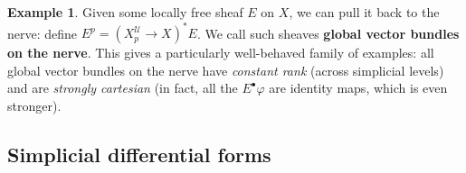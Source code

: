 \documentclass[11pt,fleqn]{article}
\theoremstyle{plain}
\theoremstyle{definition}
\newtheorem{example}[theorem]{Example}
\theoremstyle{remark}
\numberwithin{equation}{theorem}
\newcommand{\cover}{\mathcal{U}}
\newcommand{\define}[1]{\textbf{#1}}
\newcommand{\nerve}[1]{X_{#1}^\cover}
\begin{document}
        \begin{example}\label{example:global-vector-bundles}
            Given some locally free sheaf $E$ on $X$, we can pull it back to the nerve: define $E^p=(\nerve{p}\to X)^*E$.
            We call such sheaves \define{global vector bundles on the nerve}.
            This gives a particularly well-behaved family of examples: all global vector bundles on the nerve have \emph{constant rank} (across simplicial levels) and are \emph{strongly cartesian} (in fact, all the $E^\bullet\varphi$ are identity maps, which is even stronger).
        \end{example}


    \subsection{Simplicial differential forms}
\end{document}
